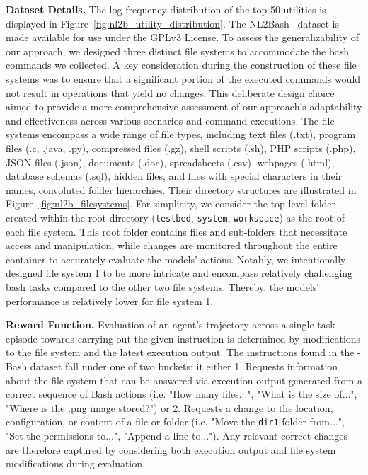\textbf{Dataset Details.} The log-frequency distribution of the top-50 utilities is displayed in Figure~\ref{fig:nl2b_utility_distribution}.
The NL2Bash~\cite{lin-etal-2018-nl2bash} dataset is made available for use under the \hyperlink{https://www.gnu.org/licenses/gpl-3.0}{GPLv3 License}.
To assess the generalizability of our approach, we designed three distinct file systems to accommodate the bash commands we collected. A key consideration during the construction of these file systems was to ensure that a significant portion of the executed commands would not result in operations that yield no changes. This deliberate design choice aimed to provide a more comprehensive assessment of our approach's adaptability and effectiveness across various scenarios and command executions. The file systems encompass a wide range of file types, including text files (.txt), program files (.c, .java, .py), compressed files (.gz), shell scripts (.sh), PHP scripts (.php), JSON files (.json), documents (.doc), spreadsheets (.csv), webpages (.html), database schemas (.sql), hidden files, and files with special characters in their names, convoluted folder hierarchies. Their directory structures are illustrated in Figure~\ref{fig:nl2b_filesystems}. For simplicity, we consider the top-level folder created within the root directory (\texttt{testbed}, \texttt{system}, \texttt{workspace}) as the root of each file system. This root folder contains files and sub-folders that necessitate access and manipulation, while changes are monitored throughout the entire container to accurately evaluate the models' actions. Notably, we intentionally designed file system 1 to be more intricate and encompass relatively challenging bash tasks compared to the other two file systems. Thereby, the models' performance is relatively lower for file system 1.



\textbf{Reward Function.} Evaluation of an agent's trajectory across a single task episode towards carrying out the given instruction is determined by modifications to the file system and the latest execution output. The instructions found in the \benchmark{}-Bash dataset fall under one of two buckets: it either 1. Requests information about the file system that can be answered via execution output generated from a correct sequence of Bash actions (i.e. "How many files...", "What is the size of...", "Where is the .png image stored?") or 2. Requests a change to the location, configuration, or content of a file or folder (i.e. "Move the \texttt{dir1} folder from...", "Set the permissions to...", "Append a line to..."). Any relevant correct changes are therefore captured by considering both execution output and file system modifications during evaluation.

